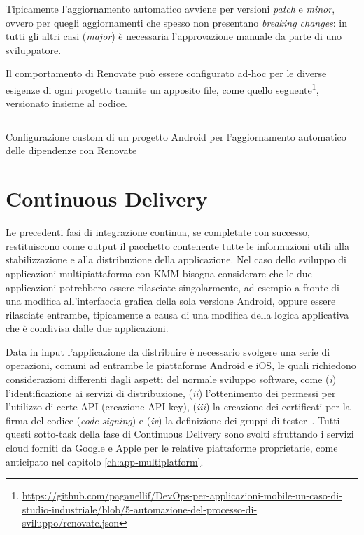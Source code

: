 Tipicamente l'aggiornamento automatico avviene per versioni \textit{patch} e \textit{minor}, ovvero per quegli aggiornamenti che spesso non presentano \textit{breaking changes}: in tutti gli altri casi (\textit{major}) è necessaria l'approvazione manuale da parte di uno sviluppatore.

Il comportamento di Renovate può essere configurato ad-hoc per le diverse esigenze di ogni progetto tramite un apposito file, come quello seguente\footnote{\href{https://github.com/paganellif/DevOps-per-applicazioni-mobile-un-caso-di-studio-industriale/blob/5-automazione-del-processo-di-sviluppo/renovate.json}{https://github.com/paganellif/DevOps-per-applicazioni-mobile-un-caso-di-studio-industriale/blob/5-automazione-del-processo-di-sviluppo/renovate.json}}, versionato insieme al codice.

\begin{listing}[H]
    \inputminted{json}{code/renovate.json}
    \caption{Configurazione custom di un progetto Android per l'aggiornamento automatico delle dipendenze con Renovate}
\end{listing}

\section{Continuous Delivery}
Le precedenti fasi di integrazione continua, se completate con successo, restituiscono come output il pacchetto contenente tutte le informazioni utili alla stabilizzazione e alla distribuzione della applicazione. Nel caso dello sviluppo di applicazioni multipiattaforma con KMM bisogna considerare che le due applicazioni potrebbero essere rilasciate singolarmente, ad esempio a fronte di una modifica all'interfaccia grafica della sola versione Android, oppure essere rilasciate entrambe, tipicamente a causa di una modifica della logica applicativa che è condivisa dalle due applicazioni.

Data in input l'applicazione da distribuire è necessario svolgere una serie di operazioni, comuni ad entrambe le piattaforme Android e iOS, le quali richiedono considerazioni differenti dagli aspetti del normale sviluppo software, come (\textit{i}) l'identificazione ai servizi di distribuzione, (\textit{ii}) l'ottenimento dei permessi per l'utilizzo di certe API (creazione API-key), (\textit{iii}) la creazione dei certificati per la firma del codice (\textit{code signing}) e (\textit{iv}) la definizione dei gruppi di tester~\cite{mednieks2011programming}. Tutti questi sotto-task della fase di Continuous Delivery sono svolti sfruttando i servizi cloud forniti da Google e Apple per le relative piattaforme proprietarie, come anticipato nel capitolo \ref{ch:app-multiplatform}.


